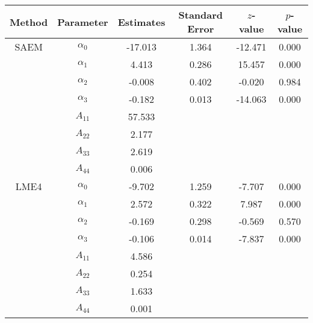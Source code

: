 \begin{table}[ht]
\centering
\begin{tabular}{cccccc}
  \hline
Method & Parameter & Estimates & Standard Error & $z$-value & $p$-value \\ 
  \hline
SAEM & $\alpha_0$ & -17.013 & 1.364 & -12.471 & 0.000 \\ 
   & $\alpha_1$ & 4.413 & 0.286 & 15.457 & 0.000 \\ 
   & $\alpha_2$ & -0.008 & 0.402 & -0.020 & 0.984 \\ 
   & $\alpha_3$ & -0.182 & 0.013 & -14.063 & 0.000 \\ 
   & $A_{11}$ & 57.533 &  &  &  \\ 
   & $A_{22}$ & 2.177 &  &  &  \\ 
   & $A_{33}$ & 2.619 &  &  &  \\ 
   & $A_{44}$ & 0.006 &  &  &  \\ 
  LME4 & $\alpha_0$ & -9.702 & 1.259 & -7.707 & 0.000 \\ 
   & $\alpha_1$ & 2.572 & 0.322 & 7.987 & 0.000 \\ 
   & $\alpha_2$ & -0.169 & 0.298 & -0.569 & 0.570 \\ 
   & $\alpha_3$ & -0.106 & 0.014 & -7.837 & 0.000 \\ 
   & $A_{11}$ & 4.586 &  &  &  \\ 
   & $A_{22}$ & 0.254 &  &  &  \\ 
   & $A_{33}$ & 1.633 &  &  &  \\ 
   & $A_{44}$ & 0.001 &  &  &  \\ 
   \hline
\end{tabular}
\end{table}
